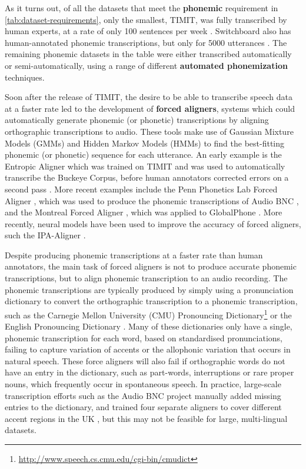 As it turns out, of all the datasets that meet the \textbf{phonemic} requirement in \cref{tab:dataset-requirements}, only the smallest, TIMIT, was fully transcribed by human experts, at a rate of only 100 sentences per week \citep{zue1996transcription, lamel1989speech}. Switchboard also has human-annotated phonemic transcriptions, but only for 5000 utterances \citep{greenberg1996insights}. The remaining phonemic datasets in the table were either transcribed automatically or semi-automatically, using a range of different \textbf{automated phonemization} techniques.

Soon after the release of TIMIT, the desire to be able to transcribe speech data at a faster rate led to the development of \textbf{forced aligners}, systems which could automatically generate phonemic (or phonetic) transcriptions by aligning orthographic transcriptions to audio. These tools make use of Gaussian Mixture Models (GMMs) and Hidden Markov Models (HMMs) to find the best-fitting phonemic (or phonetic) sequence for each utterance. An early example is the Entropic Aligner \citep{wightman1997aligner} which was trained on TIMIT and was used to automatically transcribe the Buckeye Corpus, before human annotators corrected errors on a second pass \citep{PITT200589}. More recent examples include the Penn Phonetics Lab Forced Aligner \citep{yuan2008speaker}, which was used to produce the phonemic transcriptions of Audio BNC \citep{coleman2011miningb}, and the Montreal Forced Aligner \citep{mcauliffe2017montreal}, which was applied to GlobalPhone \citep{schultz2013globalphone}. More recently, neural models have been used to improve the accuracy of forced aligners, such the IPA-Aligner \citep{zhu-etal-2024-taste}.

Despite producing phonemic transcriptions at a faster rate than human annotators, the main task of forced aligners is not to produce accurate phonemic transcriptions, but to align phonemic transcription to an audio recording. The phonemic transcriptions are typically produced by simply using a pronunciation dictionary to convert the orthographic transcription to a phonemic transcription, such as the Carnegie Mellon University (CMU) Pronouncing Dictionary\footnote{\url{http://www.speech.cs.cmu.edu/cgi-bin/cmudict}} or the English Pronouncing Dictionary \citep{jones2011cambridge}. Many of these dictionaries only have a single, phonemic transcription for each word, based on standardised pronunciations, failing to capture variation of accents or the allophonic variation that occurs in natural speech. These force aligners will also fail if orthographic words do not have an entry in the dictionary, such as part-words, interruptions or rare proper nouns, which frequently occur in spontaneous speech. In practice, large-scale transcription efforts such as the Audio BNC project manually added missing entries to the dictionary, and trained four separate aligners to cover different accent regions in the UK \citep{coleman2011miningb}, but this may not be feasible for large, multi-lingual datasets. 

